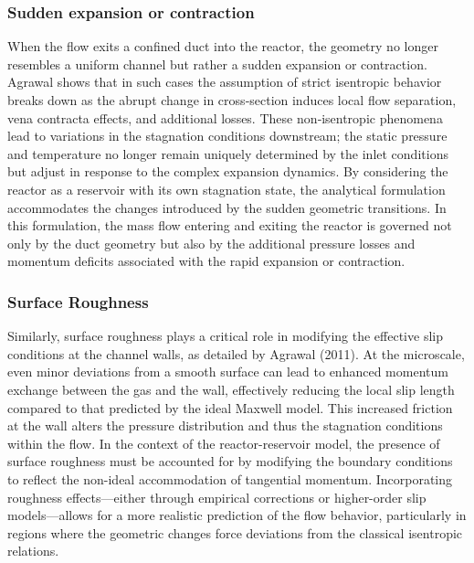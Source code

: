 \subsubsection*{Sudden expansion or contraction}
	When the flow exits a confined duct into the reactor, the geometry no longer resembles a uniform channel but rather a sudden expansion or contraction.
	Agrawal shows that in such cases the assumption of strict isentropic behavior breaks down as the abrupt change in cross‐section induces local flow separation, vena contracta effects, and additional losses.
	These non‐isentropic phenomena lead to variations in the stagnation conditions downstream; the static pressure and temperature no longer remain uniquely determined by the inlet conditions but adjust in response to the complex expansion dynamics.
	By considering the reactor as a reservoir with its own stagnation state, the analytical formulation accommodates the changes introduced by the sudden geometric transitions.
	In this formulation, the mass flow entering and exiting the reactor is governed not only by the duct geometry but also by the additional pressure losses and momentum deficits associated with the rapid expansion or contraction.

\subsubsection*{Surface Roughness}
	Similarly, surface roughness plays a critical role in modifying the effective slip conditions at the channel walls, as detailed by Agrawal (2011).
	At the microscale, even minor deviations from a smooth surface can lead to enhanced momentum exchange between the gas and the wall, effectively reducing the local slip length compared to that predicted by the ideal Maxwell model.
	This increased friction at the wall alters the pressure distribution and thus the stagnation conditions within the flow.
	In the context of the reactor-reservoir model, the presence of surface roughness must be accounted for by modifying the boundary conditions to reflect the non-ideal accommodation of tangential momentum.
	Incorporating roughness effects—either through empirical corrections or higher-order slip models—allows for a more realistic prediction of the flow behavior, particularly in regions where the geometric changes force deviations from the classical isentropic relations.\cite{agrawal_comprehensive_2011, wang_analyses_2008}
